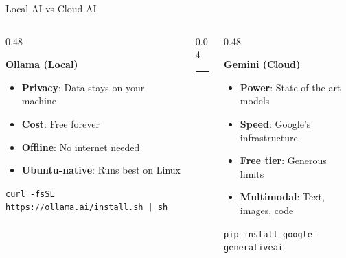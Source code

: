 \documentclass[aspectratio=169,12pt]{beamer}
\begin{document}
\begin{frame}{Local AI vs Cloud AI}
\begin{columns}
\begin{column}{0.48\textwidth}
\begin{center}
\textcolor{ubuntupurple}{\large\textbf{Ollama (Local)}}
\end{center}
\begin{itemize}
\item \textbf{Privacy}: Data stays on your machine
\item \textbf{Cost}: Free forever
\item \textbf{Offline}: No internet needed
\item \textbf{Ubuntu-native}: Runs best on Linux
\end{itemize}
\vspace{0.2cm}
{\small\texttt{curl -fsSL https://ollama.ai/install.sh | sh}}
\end{column}
\begin{column}{0.04\textwidth}
\rule{0.5pt}{4cm}
\end{column}
\begin{column}{0.48\textwidth}
\begin{center}
\textcolor{ubuntuorange}{\large\textbf{Gemini (Cloud)}}
\end{center}
\begin{itemize}
\item \textbf{Power}: State-of-the-art models
\item \textbf{Speed}: Google's infrastructure
\item \textbf{Free tier}: Generous limits
\item \textbf{Multimodal}: Text, images, code
\end{itemize}
\vspace{0.2cm}
{\small\texttt{pip install google-generativeai}}
\end{column}
\end{columns}
\end{frame}
\end{document}
